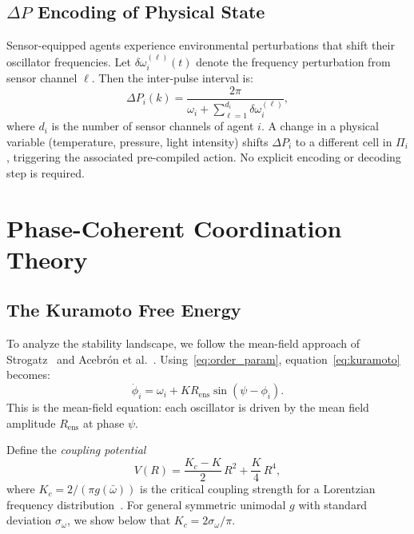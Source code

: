\documentclass[twocolumn,10pt]{article}
\newcommand{\Rens}{R_{\mathrm{ens}}}
\newcommand{\Kc}{K_c}
\newcommand{\DeltaP}{\Delta P}
\newcommand{\sigmaomega}{\sigma_{\omega}}
\begin{document}
\subsection{$\Delta P$ Encoding of Physical State}

Sensor-equipped agents experience environmental perturbations that shift their
oscillator frequencies. Let $\delta\omega_i^{(\ell)}(t)$ denote the frequency
perturbation from sensor channel $\ell$. Then the inter-pulse interval is:
\begin{equation}
\label{eq:deltap}
  \DeltaP_i(k) = \frac{2\pi}{\omega_i + \sum_{\ell=1}^{d_i}\delta\omega_i^{(\ell)}},
\end{equation}
where $d_i$ is the number of sensor channels of agent $i$. A change in a
physical variable (temperature, pressure, light intensity) shifts $\DeltaP_i$
to a different cell in $\Pi_i$, triggering the associated pre-compiled action.
No explicit encoding or decoding step is required.

\section{Phase-Coherent Coordination Theory}
\label{sec:theory}

\subsection{The Kuramoto Free Energy}

To analyze the stability landscape, we follow the mean-field approach of
Strogatz~\cite{Strogatz2000} and Acebr\'{o}n et al.~\cite{Acebron2005}.
Using~\eqref{eq:order_param}, equation~\eqref{eq:kuramoto} becomes:
\begin{equation}
\label{eq:mf}
  \dot{\phi}_i = \omega_i + K\Rens\sin(\psi - \phi_i).
\end{equation}
This is the mean-field equation: each oscillator is driven by the mean field
amplitude $\Rens$ at phase $\psi$.

Define the \emph{coupling potential}
\begin{equation}
\label{eq:potential}
  V(R) = \frac{\Kc - K}{2}\,R^2 + \frac{K}{4}\,R^4,
\end{equation}
where $\Kc = 2/(\pi g(\bar{\omega}))$ is the critical coupling strength for a
Lorentzian frequency distribution~\cite{Strogatz2000}. For general symmetric
unimodal $g$ with standard deviation $\sigmaomega$, we show below that
$\Kc = 2\sigmaomega/\pi$.
\end{document}
